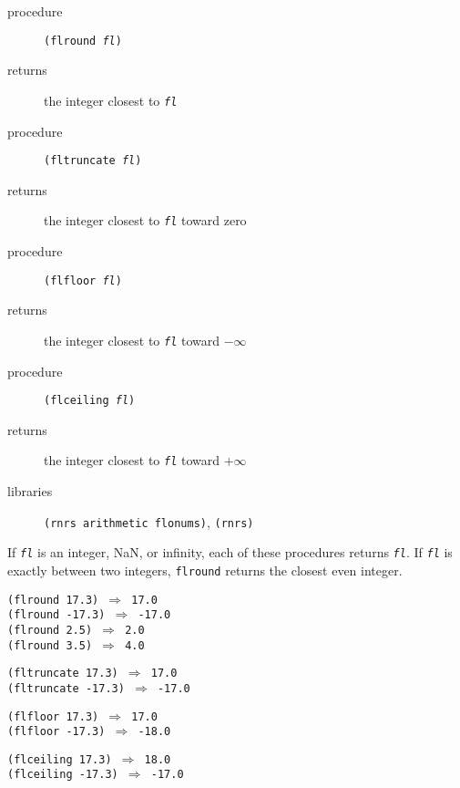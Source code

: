 \begin{description}

\label{objects_s190}\item[procedure] \texttt{(flround \textit{fl})}



\item[returns] the integer closest to \texttt{\textit{fl}}


\item[procedure] \texttt{(fltruncate \textit{fl})}



\item[returns] the integer closest to \texttt{\textit{fl}} toward zero


\item[procedure] \texttt{(flfloor \textit{fl})}



\item[returns] the integer closest to \texttt{\textit{fl}} toward \(-\infty\)


\item[procedure] \texttt{(flceiling \textit{fl})}



\item[returns] the integer closest to \texttt{\textit{fl}} toward \(+\infty\)


\item[libraries] \texttt{(rnrs arithmetic flonums)}, \texttt{(rnrs)}
\end{description}


If \texttt{\textit{fl}} is an integer, NaN, or infinity, each of these procedures returns \texttt{\textit{fl}}.
If \texttt{\textit{fl}} is exactly between two integers, \texttt{flround} returns the closest
even integer.


\begin{alltt}
(flround 17.3) \(\Rightarrow\) 17.0
(flround -17.3) \(\Rightarrow\) -17.0
(flround 2.5) \(\Rightarrow\) 2.0
(flround 3.5) \(\Rightarrow\) 4.0

(fltruncate 17.3) \(\Rightarrow\) 17.0
(fltruncate -17.3) \(\Rightarrow\) -17.0

(flfloor 17.3) \(\Rightarrow\) 17.0
(flfloor -17.3) \(\Rightarrow\) -18.0

(flceiling 17.3) \(\Rightarrow\) 18.0
(flceiling -17.3) \(\Rightarrow\) -17.0
\end{alltt}

